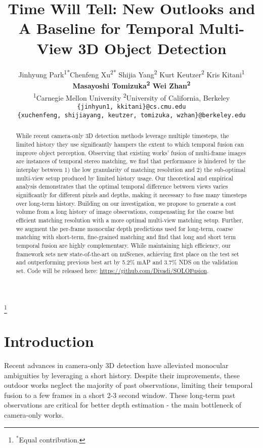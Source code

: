 \documentclass[runningheads, hyperfootnotes=false]{article}
\title{Time Will Tell: New Outlooks and A Baseline for Temporal Multi-View 3D Object Detection}
\author{Jinhyung Park\textsuperscript{1}\textsuperscript{*}\quad Chenfeng Xu\textsuperscript{2}\textsuperscript{*} \quad Shijia Yang\textsuperscript{2} \quad Kurt Keutzer\textsuperscript{2} \quad Kris Kitani\textsuperscript{1} \\ \textbf{Masayoshi Tomizuka\textsuperscript{2} \quad Wei Zhan\textsuperscript{2}}\\
\textsuperscript{1}Carnegie Mellon University \quad \textsuperscript{2}University of California, Berkeley
\\
\texttt{\{jinhyun1, kkitani\}@cs.cmu.edu} \\
\texttt{\{xuchenfeng, shijiayang, keutzer, tomizuka, wzhan\}@berkeley.edu}
}
\begin{document}
\maketitle
\let\thefootnote\relax\footnote{{$^*$Equal contribution.}}

\begin{abstract}
While recent camera-only 3D detection methods leverage multiple timesteps, the limited history they use significantly hampers the extent to which temporal fusion can improve object perception. Observing that existing works' fusion of multi-frame images are instances of temporal stereo matching, we find that performance is hindered by the interplay between 1) the low granularity of matching resolution and 2) the sub-optimal multi-view setup produced by limited history usage. Our theoretical and empirical analysis demonstrates that the optimal temporal difference between views varies significantly for different pixels and depths, making it necessary to fuse many timesteps over long-term history. Building on our investigation, we propose to generate a cost volume from a long history of image observations, compensating for the coarse but efficient matching resolution with a more optimal multi-view matching setup. Further, we augment the per-frame monocular depth predictions used for long-term, coarse matching with short-term, fine-grained matching and find that long and short term temporal fusion are highly complementary. While maintaining high efficiency, our framework sets new state-of-the-art on nuScenes, achieving first place on the test set and outperforming previous best art by 5.2\% mAP and 3.7\% NDS on the validation set. Code will be released here: \href{https://github.com/Divadi/SOLOFusion}{\color{RubineRed}https://github.com/Divadi/SOLOFusion}.
\end{abstract} \section{Introduction}
Recent advances in camera-only 3D detection have alleviated monocular ambiguities by leveraging a short history. Despite their improvements, these outdoor works neglect the majority of past observations, limiting their temporal fusion to a few frames in a short 2-3 second window. These long-term past observations are critical for better depth estimation - the main bottleneck of camera-only works.
\end{document}
